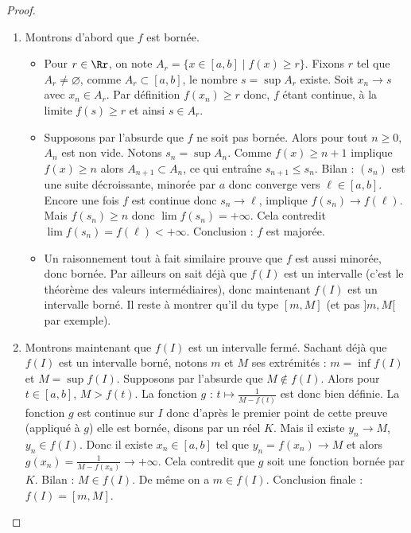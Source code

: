 \documentclass[class=report,crop=false]{standalone}
\begin{document}
\begin{proof}~
\begin{enumerate}
  \item Montrons d'abord que $f$ est bornée.
  \begin{itemize}
    \item Pour $r \in \Rr$, on note $A_r = \{ x \in [a,b] \mid f(x) \ge r\}$.
    Fixons $r$ tel que $A_r \neq \varnothing$, comme $A_r \subset [a,b]$, le nombre
    $s = \sup A_r$ existe. Soit $x_n \to s$ avec $x_n \in A_r$.
    Par définition $f(x_n) \ge r$ donc, $f$ étant continue, à la limite 
    $f(s) \ge r$ et ainsi $s \in A_r$.
    
    \item Supposons par l'absurde que $f$ ne soit pas bornée. Alors
    pour tout $n \ge 0$, $A_n$ est non vide. Notons $s_n = \sup A_n$.
    Comme $f(x) \ge n+1$ implique $f(x) \ge n$ alors $A_{n+1} \subset A_n$,
    ce qui entraîne $s_{n+1} \le s_n$. Bilan : $(s_n)$ est une suite décroissante,
    minorée par $a$ donc converge vers $\ell \in [a,b]$.
    Encore une fois $f$ est continue donc $s_n \to \ell$, implique 
    $f(s_n) \to f(\ell)$. Mais $f(s_n) \ge n$ donc $\lim f(s_n) = +\infty$.
    Cela contredit $\lim f(s_n) = f(\ell) < +\infty$. Conclusion : $f$ est majorée.
    
    \item Un raisonnement tout à fait similaire prouve que $f$ 
    est aussi minorée, donc bornée.
    Par ailleurs on sait déjà que $f(I)$ est un intervalle (c'est le théorème des valeurs 
    intermédiaires), donc maintenant $f(I)$ est un intervalle borné.
    Il reste à montrer qu'il du type $[m,M]$ (et pas $]m,M[$ par exemple).
  \end{itemize}

  
  \item Montrons maintenant que $f(I)$ est un intervalle fermé.
  Sachant déjà que $f(I)$ est un intervalle borné, notons $m$ et $M$ ses extrémités :
  $m = \inf f(I)$ et $M = \sup f(I)$. Supposons par l'absurde que 
  $M \notin f(I)$. Alors pour $t \in [a,b]$, $M > f(t)$. 
  La fonction $g$ : $t \mapsto \frac{1}{M-f(t)}$ est donc bien définie. La fonction $g$ est continue sur $I$ donc d'après 
  le premier point de cette preuve (appliqué à $g$) elle est bornée, disons par un réel $K$.
  Mais il existe $y_n \to M$, $y_n \in f(I)$. Donc il existe $x_n \in [a,b]$
  tel que $y_n = f(x_n) \to M$ et alors $g(x_n) = \frac{1}{M-f(x_n)} \to +\infty$.
  Cela contredit que $g$ soit une fonction bornée par $K$.
  Bilan : $M \in f(I)$. De même on a $m \in f(I)$.
  Conclusion finale : $f(I) = [m,M]$. 
 
\end{enumerate}
\end{proof}
\end{document}
